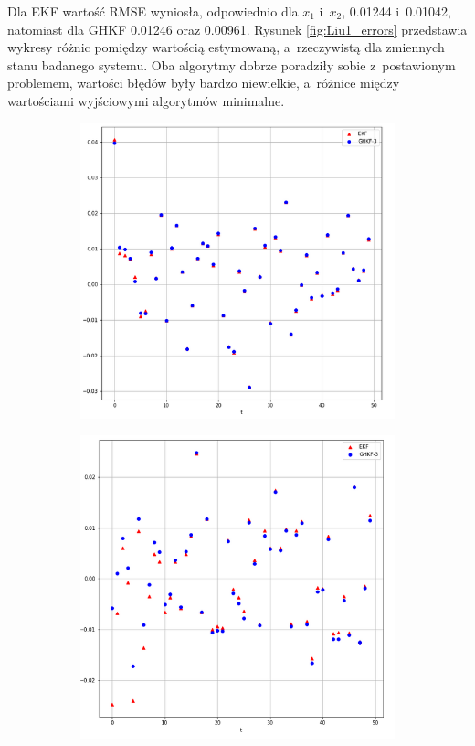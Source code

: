 Dla EKF wartość RMSE wyniosła, odpowiednio dla $x_1$ i~$x_2$, 0.01244 i~0.01042, natomiast dla GHKF 0.01246 oraz 0.00961. Rysunek \ref{fig:Liu1_errors} przedstawia wykresy różnic pomiędzy wartością estymowaną, a~rzeczywistą dla zmiennych stanu badanego systemu. Oba algorytmy dobrze poradziły sobie z~postawionym problemem, wartości błędów były bardzo niewielkie, a~różnice między wartościami wyjściowymi algorytmów minimalne.   
\begin{figure}
	\centering
	\begin{subfigure}[b]{0.4\linewidth}
		\includegraphics[width=\linewidth]{Liu1_x1_error.png}
		\caption{}
		\label{fig:Liu1_errors_a}
	\end{subfigure}
	\begin{subfigure}[b]{0.4\linewidth}
		\includegraphics[width=\linewidth]{Liu1_x2_error.png}

\end{subfigure}
\end{figure}
